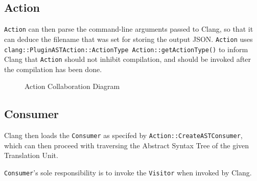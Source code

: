 \subsection{Action}
\lstinline|Action| can then parse the
command-line arguments passed to Clang, so that it can deduce the filename that
was set for storing the output JSON. \lstinline|Action| uses
\lstinline|clang::PluginASTAction::ActionType Action::getActionType()| to inform
Clang that \lstinline|Action| should not inhibit compilation, and should be
invoked after the compilation has been done.

\begin{figure}[h]
	\label{fig:action}
	\caption{Action Collaboration Diagram}
	\centering
\end{figure}

\subsection{Consumer}
Clang then loads the \lstinline|Consumer| as specifed by
\lstinline|Action::CreateASTConsumer|, which can then proceed with traversing
the Abstract Syntax Tree of the given Translation Unit.

\lstinline|Consumer|'s sole responsibility is to invoke the \lstinline|Visitor|
when invoked by Clang.

